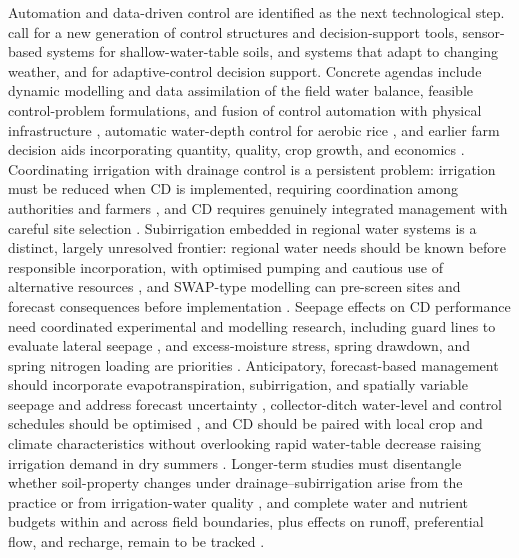Automation and data-driven control are identified as the next technological step.
\textcite{Youssef2023} call for a new generation of control structures and
decision-support tools, sensor-based systems for shallow-water-table soils, and
systems that adapt to changing weather, and \textcite{Ayars2015} for
adaptive-control decision support. Concrete agendas include dynamic modelling and
data assimilation of the field water balance, feasible control-problem
formulations, and fusion of control automation with physical infrastructure
\parencite{Ikonen2023,Isomäki2024}, automatic water-depth control for aerobic rice
\parencite{Arif2021}, and earlier farm decision aids incorporating quantity,
quality, crop growth, and economics \parencite{THOMAS1995}. Coordinating
irrigation with drainage control is a persistent problem: irrigation must be
reduced when CD is implemented, requiring coordination among authorities and
farmers \parencite{Wahba2005,Ritzema2011,Ritzema2016}, and CD requires genuinely
integrated management with careful site selection \parencite{Dukhovny2018}.
Subirrigation embedded in regional water systems is a distinct, largely
unresolved frontier: regional water needs should be known before responsible
incorporation, with optimised pumping and cautious use of alternative resources
\parencite{deWit2022}, and SWAP-type modelling can pre-screen sites and forecast
consequences before implementation \parencite{deWit2024}. Seepage effects on CD
performance need coordinated experimental and modelling research, including guard
lines to evaluate lateral seepage \parencite{Youssef2021,Pease2017,Ale2009}, and
excess-moisture stress, spring drawdown, and spring nitrogen loading are priorities
\parencite{Craft2018,Lahdou2019}. Anticipatory, forecast-based management should
incorporate evapotranspiration, subirrigation, and spatially variable seepage and
address forecast uncertainty \parencite{VandeCraats2021}, collector-ditch
water-level and control schedules should be optimised
\parencite{Salla2022,Strock2025b}, and CD should be paired with local crop and
climate characteristics without overlooking rapid water-table decrease raising
irrigation demand in dry summers
\parencite{Güngör2023,Dou2023,Golmohammadi2016,Kim2023,Wang2020c}. Longer-term
studies must disentangle whether soil-property changes under
drainage--subirrigation arise from the practice or from irrigation-water quality
\parencite{Kaur2023}, and complete water and nutrient budgets within and across
field boundaries, plus effects on runoff, preferential flow, and recharge, remain
to be tracked \parencite{Shedekar2021,Ross2016,King2022}.

